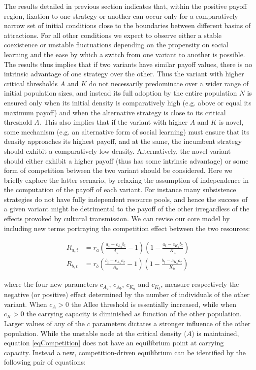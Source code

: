 \documentclass[review,authoryear]{elsarticle}
\begin{document}
The results detailed in previous section indicates that, within the positive payoff region, fixation to one strategy or another can occur only for a comparatively narrow set of initial conditions close to the boundaries between different basins of attractions. For all other conditions we expect to observe either a stable coexistence or unstable fluctuations depending on the propensity on social learning and the ease by which a switch from one variant to another is possible. The results thus implies that if two variants have similar payoff values, there is no intrinsic advantage of one strategy over the other. Thus the variant with higher critical thresholds $A$ and $K$ do not necessarily predominate over a wider range of initial population sizes, and instead its full adoption by the entire population $N$ is ensured only when its initial density is comparatively high (e.g. above or equal its maximum payoff) and when the alternative strategy is close to its critical threshold $A$. This also implies that if the variant with higher $A$ and $K$ is novel, some mechanism (e.g. an alternative form of social learning) must ensure that its density approaches its highest payoff, and at the same, the incumbent strategy should exhibit a comparatively low density. Alternatively, the novel variant should either exhibit a higher payoff (thus has some intrinsic advantage) or some form of competition between the two variant should be considered. Here we briefly explore the latter scenario, by relaxing the assumption of independence in the computation of the payoff of each variant. For instance many subsistence strategies do not have fully independent resource pools, and hence the success of a given variant might be detrimental to the payoff of the other irregardless of the effects provoked by cultural transmission. We can revise our core model by including new terms portraying the competition effect between the two resources:  

\begin{equation}
\begin{aligned}
R_{a,t}& = r_a \left(\frac{a_t-c_{A_a}b_t}{A_a}-1\right)\left(1-\frac{a_t-c_{K_a}b_t}{K_a}\right)\\
R_{b,t}& = r_b  \left(\frac{b_t-c_{A_b}a_t}{A_b}-1\right)\left(1-\frac{b_t-c_{K_b}a_t}{K_b}\right) 
\label{eqCompetition}
\end{aligned}
\end{equation}

where the four new parameters $c_{A_a}$, $c_{A_b}$, $c_{K_a}$ and $c_{K_b}$, measure respectively the negative (or positive) effect determined by the number of individuals of the other variant. 
When $c_{A}>0$ the Allee threshold is essentially increased, while when $c_{K}>0$ the carrying capacity is diminished as function of the other population. 
Larger values of any of the $c$ parameters dictates a stronger influence of the other population. While the unstable node at the critical density ($A$) is maintained, equation \eqref{eqCompetition} does not have an equilibrium point at carrying capacity. Instead a new, competition-driven equilibrium can be identified by the following pair of equations: 
\end{document}
